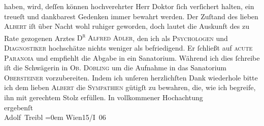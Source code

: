 \begin{ledgroupsized}[t]{13cm}
                    haben, wird, deſſen können hochverehrter Herr Doktor ſich verſichert halten, ein
                    treueſt und dankbarest Gedenken immer bewahrt werden.\pend
           \pstart
           Der Zuſtand des lieben \textsc{Albert} iſt über Nacht wohl ruhiger geworden, doch lautet {\pb}die Auskunft des zu Rate gezogenen Arztes \textsc{D\textsuperscript{r}{ }Alfred Adler}, den ich als \textsc{Psychologen} und \textsc{Diagnostiker} hochschätze nichts weniger als
                    befriedigend. Er ſchließt auf \textsc{acute Paranoia} und
                    empfiehlt die Abgabe in ein Sanatorium.\pend
           \pstart
           Während ich dies ſchreibe iſt die Schwägerin in \textsc{Ob. Döbling} um die Aufnahme in das Sanatorium \textsc{Obersteiner} vorzubereiten.\pend
           \pstart
           Indem ich unſeren herzlichſten Dank wiederhole {\pb}bitte ich dem lieben \textsc{Albert} die \textsc{Sympathien} gütigſt zu bewahren, die, wie ich
                    begreife, ihn mit gerechtem Stolz erfüllen.\pend
           \pstart
           In vollkommener Hochachtung{\\[\baselineskip]}ergebenſt{\\[\baselineskip]}\spacefill\mbox{Adolf Treibl}\pend
           \leftskip=0em{}\pstart
           Wien15/I 06\pend
                     \endnumbering{}\end{ledgroupsized}  \newcommand{\dateiname}{L01572}\newcommand{\titel}{Adolf Treibl an Arthur Schnitzler, 15. 1. 1906}\newcommand{\editorInnen}{Martin Anton Müller und Gerd-Hermann Susen}
            \footnotesize
\begin{ledgroupsized}[t]{11.5cm}
\end{ledgroupsized}
         
      